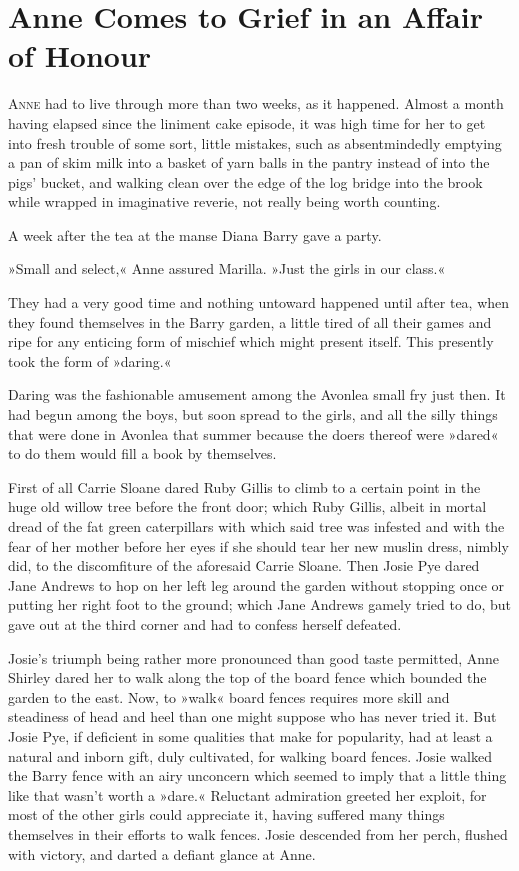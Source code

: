 \chapter{Anne Comes to Grief in an Affair of Honour}

\lettrine[lines=4]{A}{nne} had to live through more than two weeks, as it happened. Almost a month having elapsed since the liniment cake episode, it was high time for her to get into fresh trouble of some sort, little mistakes, such as absentmindedly emptying a pan of skim milk into a basket of yarn balls in the pantry instead of into the pigs' bucket, and walking clean over the edge of the log bridge into the brook while wrapped in imaginative reverie, not really being worth counting.

A week after the tea at the manse Diana Barry gave a party.

»Small and select,« Anne assured Marilla. »Just the girls in our class.«

They had a very good time and nothing untoward happened until after tea, when they found themselves in the Barry garden, a little tired of all their games and ripe for any enticing form of mischief which might present itself. This presently took the form of »daring.«

Daring was the fashionable amusement among the Avonlea small fry just then. It had begun among the boys, but soon spread to the girls, and all the silly things that were done in Avonlea that summer because the doers thereof were »dared« to do them would fill a book by themselves.

First of all Carrie Sloane dared Ruby Gillis to climb to a certain point in the huge old willow tree before the front door; which Ruby Gillis, albeit in mortal dread of the fat green caterpillars with which said tree was infested and with the fear of her mother before her eyes if she should tear her new muslin dress, nimbly did, to the discomfiture of the aforesaid Carrie Sloane. Then Josie Pye dared Jane Andrews to hop on her left leg around the garden without stopping once or putting her right foot to the ground; which Jane Andrews gamely tried to do, but gave out at the third corner and had to confess herself defeated.

Josie's triumph being rather more pronounced than good taste permitted, Anne Shirley dared her to walk along the top of the board fence which bounded the garden to the east. Now, to »walk« board fences requires more skill and steadiness of head and heel than one might suppose who has never tried it. But Josie Pye, if deficient in some qualities that make for popularity, had at least a natural and inborn gift, duly cultivated, for walking board fences. Josie walked the Barry fence with an airy unconcern which seemed to imply that a little thing like that wasn't worth a »dare.« Reluctant admiration greeted her exploit, for most of the other girls could appreciate it, having suffered many things themselves in their efforts to walk fences. Josie descended from her perch, flushed with victory, and darted a defiant glance at Anne.

